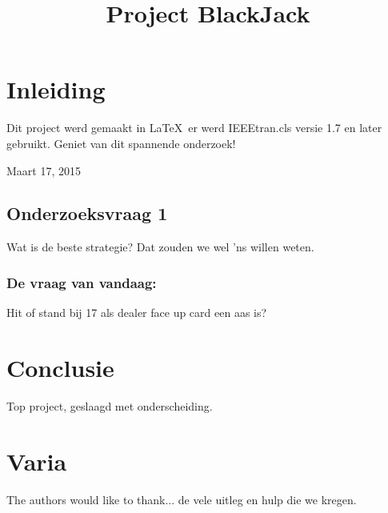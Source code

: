 \documentclass[conference]{IEEEtran}
\begin{document}
\title{Project BlackJack}
\author{
}
\maketitle

\IEEEpeerreviewmaketitle

\section{Inleiding}
Dit project werd gemaakt in \LaTeX\ er werd
IEEEtran.cls versie 1.7 en later gebruikt.
Geniet van dit spannende onderzoek!
 
\hfill Maart 17, 2015

\subsection{Onderzoeksvraag 1}
Wat is de beste strategie? Dat zouden we wel 'ns willen weten.


\subsubsection{De vraag van vandaag:}
Hit of stand bij 17 als dealer face up card een aas is?

\section{Conclusie}
Top project, geslaagd met onderscheiding.

\section*{Varia}


The authors would like to thank... de vele uitleg en hulp die we kregen.

\end{document}
